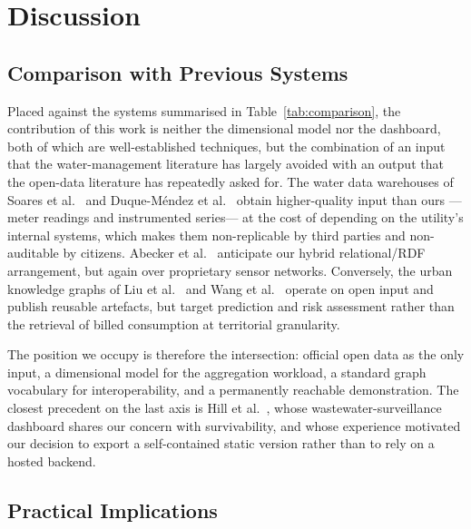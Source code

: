 \documentclass[runningheads]{llncs}
\renewcommand{\_}{\origunderscore\allowbreak}
\newif\ifshowchanges
\newenvironment{chgblock}{\ifshowchanges\color{chg}\fi}{}
\begin{document}
\begin{chgblock}
\section{Discussion}
\label{sec:disc}

\subsection{Comparison with Previous Systems}

Placed against the systems summarised in Table~\ref{tab:comparison}, the
contribution of this work is neither the dimensional model nor the dashboard,
both of which are well-established techniques, but the combination of an input
that the water-management literature has largely avoided with an output that the
open-data literature has repeatedly asked for. The water data warehouses of
Soares et al.~\cite{soares2019} and Duque-M\'endez et al.~\cite{duque2014} obtain
higher-quality input than ours ---meter readings and instrumented series--- at
the cost of depending on the utility's internal systems, which makes them
non-replicable by third parties and non-auditable by citizens. Abecker et
al.~\cite{abecker2014} anticipate our hybrid relational/RDF arrangement, but
again over proprietary sensor networks. Conversely, the urban knowledge graphs of
Liu et al.~\cite{liu2023} and Wang et al.~\cite{wang2023} operate on open input
and publish reusable artefacts, but target prediction and risk assessment rather
than the retrieval of billed consumption at territorial granularity.

The position we occupy is therefore the intersection: official open data as the
only input, a dimensional model for the aggregation workload, a standard graph
vocabulary for interoperability, and a permanently reachable demonstration. The
closest precedent on the last axis is Hill et al.~\cite{hill2023}, whose
wastewater-surveillance dashboard shares our concern with survivability, and
whose experience motivated our decision to export a self-contained static version
rather than to rely on a hosted backend.

\subsection{Practical Implications}


\end{chgblock}
\end{document}
